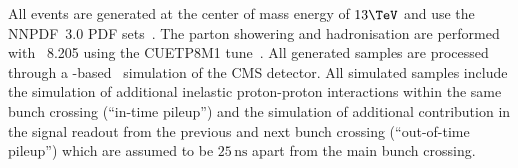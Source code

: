All events are generated at the center of mass 
energy of $13\TeV$ and use the NNPDF~3.0 PDF sets~\cite{Ball:2014uwa}.
The parton showering and hadronisation are performed with \PYTHIA~8.205 using 
the CUETP8M1 tune~\cite{Skands:2014pea,CMS-PAS-GEN-14-001}.
All generated samples are processed through a 
\GEANTfour-based~\cite{Agostinelli:2002hh} simulation of the CMS detector.
All simulated samples include the simulation of additional inelastic 
proton-proton interactions within the same bunch crossing (``in-time pileup'') 
and the simulation of additional contribution in the signal readout from the 
previous and next bunch crossing (``out-of-time pileup'')
which are assumed to be $25\,\text{ns}$ apart from the main bunch crossing.
